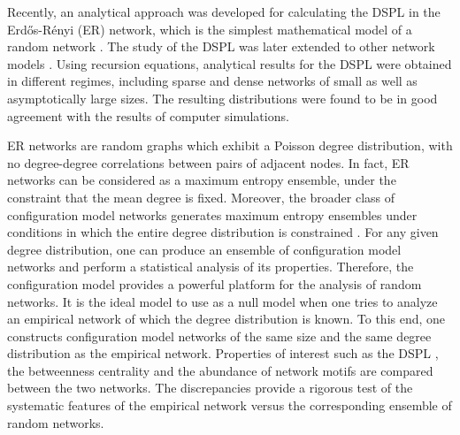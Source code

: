 \documentclass[preprint,pre,superscriptaddress,showpacs]{revtex4}
\begin{document}
Recently, an analytical approach was developed for calculating 
the DSPL 
\cite{Katzav2015}
in the
Erd{\H o}s-R\'enyi (ER) network,
which is the simplest mathematical model of a random network
\cite{Erdos1959,Erdos1960,Erdos1961}. 
The study of the DSPL was later extended to other network models
\cite{Nitzan2016,Melnik2016,Steinbock2017}.
Using recursion equations, analytical results for 
the DSPL were obtained in different regimes, including sparse and dense 
networks of small as well as asymptotically large sizes.
The resulting distributions were found to 
be in good agreement with the results of computer simulations. 

ER networks are random graphs which exhibit
a Poisson degree distribution, with no degree-degree correlations
between pairs of adjacent nodes. 
In fact, ER networks can be considered as a 
maximum entropy ensemble, under the constraint
that the mean degree is fixed.
Moreover, the broader class of configuration model networks
generates maximum entropy ensembles
under conditions in which the entire degree distribution is constrained
\cite{Newman2010,Newman2001,Fronczak2004,Molloy1995,Molloy1998}.
For any given degree distribution, one can produce an ensemble 
of configuration model networks and perform a statistical analysis
of its properties.
Therefore, the configuration model provides a 
powerful platform for the analysis of random networks.
It is the ideal model to use as a null model
when one tries to analyze an empirical network of which the
degree distribution is known.
To this end, one constructs configuration model networks 
of the same size and the same degree distribution as 
the empirical network.
Properties of interest 
such as the DSPL
\cite{Giot2003},
the betweenness centrality
\cite{Goh2003}
and the abundance of network motifs
\cite{Milo2002,Caldarelli2004,Klemm2006}
are compared between the two networks. 
The discrepancies provide a rigorous test of the
systematic features of the empirical network versus the 
corresponding ensemble of random networks.
\end{document}
